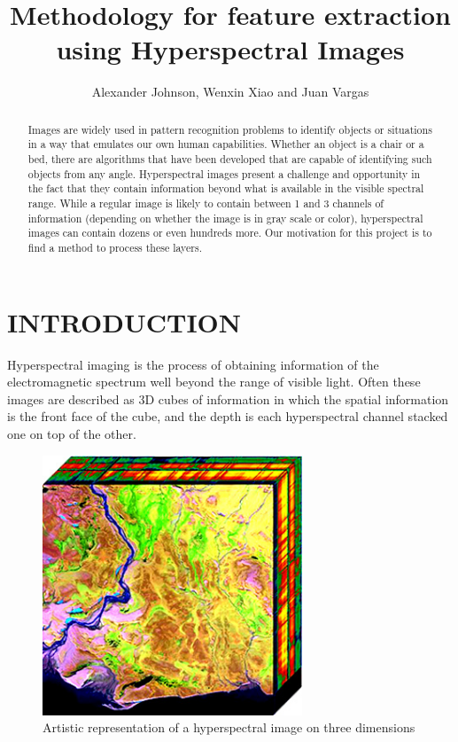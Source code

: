 \documentclass[letterpaper, 10 pt, conference]{ieeeconf}  %
\title{\LARGE \bf
Methodology for feature extraction using Hyperspectral Images
}
\author{Alexander Johnson, Wenxin Xiao and Juan Vargas%
}
\begin{document}
\maketitle
\thispagestyle{empty}
\pagestyle{empty}


\begin{abstract}

Images are widely used in pattern recognition problems to identify objects or situations in a way that emulates our own human capabilities. Whether an object is a chair or a bed, there are algorithms that have been developed that are capable of identifying such objects from any angle. Hyperspectral images present a challenge and opportunity in the fact that they contain information beyond what is available in the visible spectral range. While a regular image is likely to contain between 1 and 3 channels of information (depending on whether the image is in gray scale or color), hyperspectral images can contain dozens or even hundreds more. Our motivation for this project is to find a method to process these layers.  

\end{abstract}


\section{INTRODUCTION}

Hyperspectral imaging is the process of obtaining information of the electromagnetic spectrum well beyond the range of visible light. Often these images are described as 3D cubes of information in which the spatial information is the front face of the cube, and the depth is each hyperspectral channel stacked one on top of the other.


\begin{figure}[thpb]
      \centering
      \includegraphics[width=220pt]{HyperspectralCube.jpg}
      \caption{Artistic representation of a hyperspectral image on three dimensions}
      \label{figure_HSI_cube}
   \end{figure}
\end{document}
